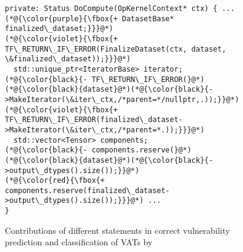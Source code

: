 \begin{figure}[t]
\centering
{}
	\begin{lstlisting}[]
private: Status DoCompute(OpKernelContext* ctx) { ...
(*@{\color{purple}{\fbox{+ DatasetBase* finalized\_dataset;}}}@*)
(*@{\color{violet}{\fbox{+ TF\_RETURN\_IF\_ERROR(FinalizeDataset(ctx, dataset, \&finalized\_dataset));}}}@*)
  std::unique_ptr<IteratorBase> iterator;
(*@{\color{black}{- TF\_RETURN\_IF\_ERROR(}@*)(*@{\color{black}{dataset}@*)(*@{\color{black}{->MakeIterator(\&iter\_ctx,/*parent=*/nullptr,.));}}@*)
(*@{\color{violet}{\fbox{+ TF\_RETURN\_IF\_ERROR(finalized\_dataset->MakeIterator(\&iter\_ctx,/*parent=*.));}}}@*)
  std::vector<Tensor> components;
(*@{\color{black}{- components.reserve(}@*)(*@{\color{black}{dataset}@*)(*@{\color{black}{->output\_dtypes().size());}}@*)
(*@{\color{red}{\fbox{+ components.reserve(finalized\_dataset->output\_dtypes().size());}}}@*) ...
}
\end{lstlisting}
\vspace{-15pt}
\caption{Contributions of different statements in correct
vulnerability prediction and classification of VATs by {\tool}}
\vspace{-6pt}
\label{gnn-example}
\end{figure}
